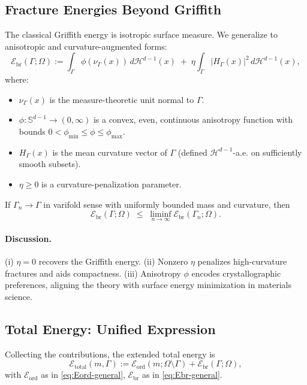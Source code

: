 \subsection{Fracture Energies Beyond Griffith}
The classical Griffith energy is isotropic surface measure.
We generalize to anisotropic and curvature-augmented forms:
\begin{equation}\label{eq:Ebr-general}
  \mathcal{E}_{\mathrm{br}}(\Gamma;\Omega)
   := \int_{\Gamma} \phi(\nu_\Gamma(x))\, d\mathcal{H}^{d-1}(x)
      \;+\; \eta \int_{\Gamma} |H_\Gamma(x)|^2\, d\mathcal{H}^{d-1}(x),
\end{equation}
where:
\begin{itemize}
  \item $\nu_\Gamma(x)$ is the measure-theoretic unit normal to $\Gamma$.
  \item $\phi:\mathbb{S}^{d-1}\to (0,\infty)$ is a convex, even, continuous anisotropy function with bounds $0<\phi_{\min}\le\phi\le \phi_{\max}$.
  \item $H_\Gamma(x)$ is the mean curvature vector of $\Gamma$ (defined $\mathcal{H}^{d-1}$-a.e. on sufficiently smooth subsets).
  \item $\eta\ge 0$ is a curvature-penalization parameter.
\end{itemize}

\begin{proposition}\label{prop:lsc-general-fracture}
If $\Gamma_n\to\Gamma$ in varifold sense with uniformly bounded mass and curvature, then
\[
  \mathcal{E}_{\mathrm{br}}(\Gamma;\Omega) \;\le\; \liminf_{n\to\infty} \mathcal{E}_{\mathrm{br}}(\Gamma_n;\Omega).
\]
\end{proposition}

\paragraph{Discussion.}
(i) $\eta=0$ recovers the Griffith energy.  
(ii) Nonzero $\eta$ penalizes high-curvature fractures and aids compactness.  
(iii) Anisotropy $\phi$ encodes crystallographic preferences, aligning the theory with surface energy minimization in materials science.  

\subsection{Total Energy: Unified Expression}
Collecting the contributions, the extended total energy is
\begin{equation}\label{eq:Etot-extended}
  \mathcal{E}_{\mathrm{total}}(m,\Gamma)
    := \mathcal{E}_{\mathrm{ord}}(m;\Omega\setminus\Gamma)
      + \mathcal{E}_{\mathrm{br}}(\Gamma;\Omega),
\end{equation}
with $\mathcal{E}_{\mathrm{ord}}$ as in \eqref{eq:Eord-general}, $\mathcal{E}_{\mathrm{br}}$ as in \eqref{eq:Ebr-general}.


